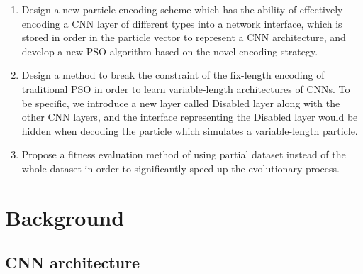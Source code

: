\documentclass[conference]{IEEEtran}
\begin{document}
\begin{enumerate}
	\item Design a new particle encoding scheme which has the ability of effectively encoding a CNN layer of different types into a network interface, which is stored in order in the particle vector to represent a CNN architecture, and develop a new PSO algorithm based on the novel encoding strategy. 
	\item Design a method to break the constraint of the fix-length encoding of traditional PSO in order to learn variable-length architectures of CNNs. To be specific, we introduce a new layer called Disabled layer along with the other CNN layers, and the interface representing the Disabled layer would be hidden when decoding the particle which simulates a variable-length particle. 
	\item Propose a fitness evaluation method of using partial dataset instead of the whole dataset in order to significantly speed up the evolutionary process. 
\end{enumerate} 



\section{Background}\label{sec:Background}

\subsection{CNN architecture}\label{sec:CNNArchitecture}
\end{document}

